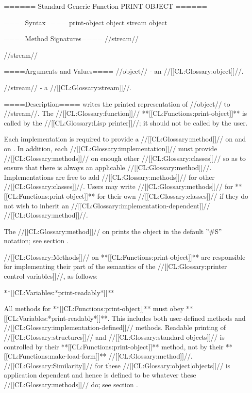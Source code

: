 ====== Standard Generic Function PRINT-OBJECT ======

====Syntax====
\DefgenWithValues print-object {object stream} {object}

====Method Signatures====
 { //stream//}

 { //stream//}

====Arguments and Values====
//object// - an //[[CL:Glossary:object]]//.

//stream// - a //[[CL:Glossary:stream]]//.


====Description====
 writes the printed representation of //object// to //stream//. The //[[CL:Glossary:function]]// **[[CL:Functions:print-object]]** is called by the //[[CL:Glossary:Lisp printer]]//; it should not be called by the user.

Each implementation is required to provide a //[[CL:Glossary:method]]// on  and on . In addition, each //[[CL:Glossary:implementation]]// must provide //[[CL:Glossary:methods]]// on enough other //[[CL:Glossary:classes]]// so as to ensure that there is always an applicable //[[CL:Glossary:method]]//. Implementations are free to add //[[CL:Glossary:methods]]// for other //[[CL:Glossary:classes]]//. Users may write //[[CL:Glossary:methods]]// for **[[CL:Functions:print-object]]** for their own //[[CL:Glossary:classes]]// if they do not wish to inherit an //[[CL:Glossary:implementation-dependent]]// //[[CL:Glossary:method]]//.

The //[[CL:Glossary:method]]// on  prints the object in the default ''#S'' notation; see section {\secref\PrintingStructures}.

//[[CL:Glossary:Methods]]// on **[[CL:Functions:print-object]]** are responsible for implementing their part of the semantics of the //[[CL:Glossary:printer control variables]]//, as follows:

\beginlist


\item{**[[CL:Variables:*print-readably*]]**}

All methods for **[[CL:Functions:print-object]]** must obey **[[CL:Variables:*print-readably*]]**. This includes both user-defined methods and //[[CL:Glossary:implementation-defined]]// methods. Readable printing of //[[CL:Glossary:structures]]// and //[[CL:Glossary:standard objects]]// is controlled by their **[[CL:Functions:print-object]]** method, not by their **[[CL:Functions:make-load-form]]** //[[CL:Glossary:method]]//. //[[CL:Glossary:Similarity]]// for these //[[CL:Glossary:object|objects]]// is application dependent and hence is defined to be whatever these //[[CL:Glossary:methods]]// do; see section {\secref\Similarity}.


